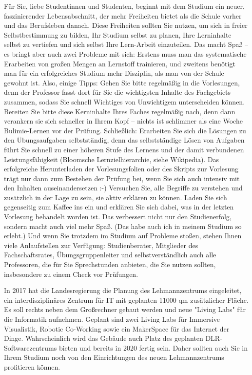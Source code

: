 {Für Sie, liebe Studentinnen und Studenten, beginnt mit dem Studium ein neuer, faszinierender Lebensabschnitt, der mehr Freiheiten bietet als die Schule vorher und das Berufsleben danach. Diese Freiheiten sollten Sie nutzen, um sich in freier Selbstbestimmung zu bilden, Ihr Studium selbst zu planen, Ihre Lerninhalte selbst zu vertiefen und sich selbst Ihre Lern-Arbeit einzuteilen. Das macht Spaß -- es bringt aber auch zwei Probleme mit sich: Erstens muss man das systematische Erarbeiten von großen Mengen an Lernstoff trainieren, und zweitens benötigt man für ein erfolgreiches Studium mehr Disziplin, als man von der Schule gewohnt ist. Also, einige Tipps: Gehen Sie bitte regelmäßig in die Vorlesungen, denn der Professor fasst dort für Sie die wichtigsten Inhalte des Fachgebiets zusammen, sodass Sie schnell Wichtiges von Unwichtigem unterscheiden können. Bereiten Sie bitte diese Kerninhalte Ihres Faches regelmäßig nach, denn dann verankern sie sich schneller in Ihrem Kopf -- nichts ist schlimmer als eine Woche Bulimie-Lernen vor der Prüfung. Schließlich: Erarbeiten Sie sich die Lösungen zu den Übungsaufgaben selbstständig, denn das selbstständige Lösen von Aufgaben führt Sie schnell zu einer höheren Stufe des Lernens und der damit verbundenen Leistungsfähigkeit (Bloomsche Lernzielhierarchie, siehe Wikipedia). Das erfolgreiche Herunterladen der Vorlesungsfolien oder des Skripts zur Vorlesung trägt nur dann zum Bestehen der Prüfung bei, wenn Sie sich auch intensiv mit den Inhalten auseinandersetzen :-) Versuchen Sie, alle Begriffe zu verstehen und zusätzlich in der Lage zu sein, sie aktiv erklären zu können. Laden Sie sich gegenseitig zum Kaffee ins \ascii{} ein und erklären Sie sich dabei, was in der letzten Vorlesung behandelt worden ist.  Das verbessert nicht nur den Studienerfolg, sondern macht auch viel mehr Spaß. (Das habe auch ich in meinem Studium so erlebt.) Und wenn Sie trotzdem im Studium auf Probleme stoßen, stehen Ihnen viele Anlaufstellen zur Verfügung: Studienberater, Mitglieder des Fachschaftsrates, Übungsgruppenleiter und selbstverständlich auch alle Professoren, die für Sie Sprechstunden anbieten, die Sie nutzen sollten, insbesondere zu einem Check vor Prüfungen.

In 2017 hat die Landesregierung die Planung des Lehmannzentrums eingeleitet, ein interdisziplinäres Zentrum für IT mit geplanten 11000 qm zusätzlicher Fläche. Es soll rechts neben dem Großrechner gebaut werden und neue "Living Labs" für die Informatik aufnehmen. Geplant sind zwei Living Labs für Immersive Visualistik, Robotic Co-Working sowie ein MakerSpace für das Internet der Dinge. Wahrscheinlich wird das Gebäude auch Platz des geplanten DLR-Softwarezentrums bieten und bereits in 2020 fertig sein. Daher sollten auch Sie in Ihrem Studium noch von den Einrichtungen des neuen Lehmannzentrums profitieren können.

}
